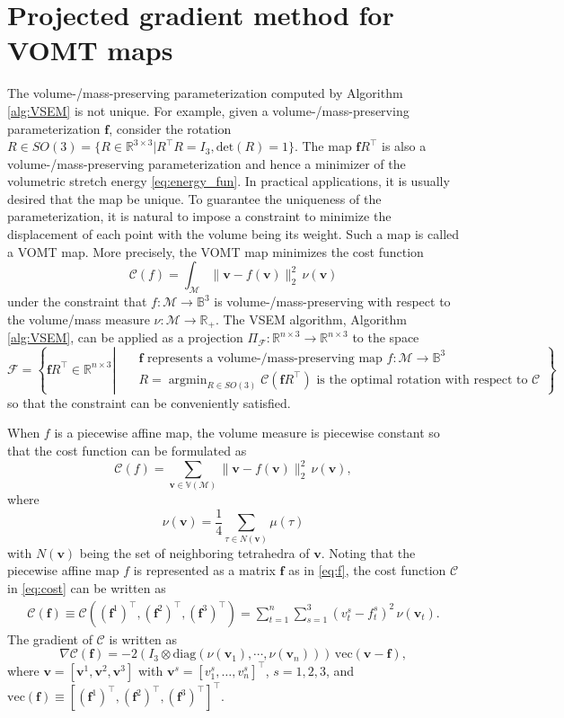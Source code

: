 \documentclass[onefignum,onetabnum]{siamonline220329}
\newcounter{example}
\numberwithin{equation}{section}
\def\vec{{\mathrm{vec}}}
\def\diag{{\mathrm{diag}}}
\def\f{\mathbf{f}}
\def\bv{\mathbf{v}}
\DeclareMathOperator*{\argmin}{argmin}
\begin{document}
\begin{sloppypar}
\section{Projected gradient method for VOMT maps}
\label{sec:5}

The volume-/mass-preserving parameterization computed by Algorithm \ref{alg:VSEM} is not unique. For example, given a volume-/mass-preserving parameterization $\f$, consider the rotation $R\in SO(3) = \{R \in \mathbb{R}^{3 \times 3}| R^{\top} R = I_3, \mbox{det}(R) = 1 \}$. The map $\f R^\top$ is also a volume-/mass-preserving parameterization and hence a minimizer of the volumetric stretch energy \eqref{eq:energy_fun}. In practical applications, it is usually desired that the map be unique.
To guarantee the uniqueness of the parameterization, it is natural to impose a constraint to minimize the displacement of each point with the volume being its weight. Such a map is called a VOMT map.
More precisely, the VOMT map minimizes the cost function
\begin{equation*}
\mathcal{C}(f) = \int_\mathcal{M} \| \bv - f(\bv) \|_2^2 \,\nu(\bv)
\end{equation*}
under the constraint that $f:\mathcal{M}\to\mathbb{B}^3$ is volume-/mass-preserving with respect to the volume/mass measure $\nu:\mathcal{M}\to\mathbb{R}_+$.
The VSEM algorithm, Algorithm \ref{alg:VSEM}, can be applied as a projection $\Pi_{\mathscr{F}}:\mathbb{R}^{n\times 3}\to\mathbb{R}^{n\times 3}$ to the space
$$
\mathscr{F} = \left\{ \f R^\top \in\mathbb{R}^{n\times 3} \left| 
\begin{aligned}
&\textrm{ $\f$ represents a volume-/mass-preserving map $f:\mathcal{M}\to\mathbb{B}^3$} \\
&\textrm{ $R = \argmin_{R\in SO(3)} \mathcal{C}(\f R^\top)$ is the optimal rotation with respect to $\mathcal{C}$}
\end{aligned} \right.\right\}
$$
so that the constraint can be conveniently satisfied.

When $f$ is a piecewise affine map, the volume measure is piecewise constant so that the cost function can be formulated as
\begin{equation} \label{eq:cost}
\mathcal{C}(f) = \sum_{\bv\in\mathbb{V}(\mathcal{M})} \| \bv - f(\bv) \|_2^2 \,\nu(\bv),
\end{equation}
where
$$
\nu(\bv) = \frac{1}{4} \sum_{\tau\in N(\bv)} \mu(\tau)
$$
with $N(\bv)$ being the set of neighboring tetrahedra of $\bv$.
Noting that the piecewise affine map $f$ is represented as a matrix $\mathbf{f}$ as in \eqref{eq:f}, the cost function $\mathcal{C}$ in \eqref{eq:cost} can be written as
\begin{align*}
\mathcal{C}(\f) \equiv \mathcal{C}((\mathbf{f}^1)^\top, (\mathbf{f}^2)^\top, (\mathbf{f}^3)^\top) 
= \sum_{t=1}^n \sum_{s=1}^3 (v_t^s - f_t^s)^2 \,\nu(\bv_t).
\end{align*}
The gradient of $\mathcal{C}$ is written as
$$
\nabla\mathcal{C}(\f) = -2 (I_3 \otimes \diag(\nu(\bv_1), \cdots, \nu(\bv_n))) \,
\vec(\bv-\f),
$$
where $\bv = [\bv^1, \bv^2, \bv^3]$ with $\bv^s = [v_1^s, \ldots, v_n^s]^\top$, $s=1,2,3$, and
$
\vec(\f) \equiv [
(\f^1)^{\top},
(\f^2)^{\top},
(\f^3)^{\top}
]^{\top}.
$


\end{sloppypar}
\end{document}
